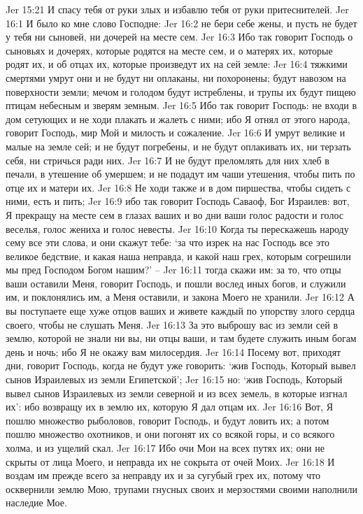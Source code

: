Jer 15:21  И спасу тебя от руки злых и избавлю тебя от руки притеснителей.
Jer 16:1  И было ко мне слово Господне:
Jer 16:2  не бери себе жены, и пусть не будет у тебя ни сыновей, ни дочерей на месте сем.
Jer 16:3  Ибо так говорит Господь о сыновьях и дочерях, которые родятся на месте сем, и о матерях их, которые родят их, и об отцах их, которые произведут их на сей земле:
Jer 16:4  тяжкими смертями умрут они и не будут ни оплаканы, ни похоронены; будут навозом на поверхности земли; мечом и голодом будут истреблены, и трупы их будут пищею птицам небесным и зверям земным.
Jer 16:5  Ибо так говорит Господь: не входи в дом сетующих и не ходи плакать и жалеть с ними; ибо Я отнял от этого народа, говорит Господь, мир Мой и милость и сожаление.
Jer 16:6  И умрут великие и малые на земле сей; и не будут погребены, и не будут оплакивать их, ни терзать себя, ни стричься ради них.
Jer 16:7  И не будут преломлять для них хлеб в печали, в утешение об умершем; и не подадут им чаши утешения, чтобы пить по отце их и матери их.
Jer 16:8  Не ходи также и в дом пиршества, чтобы сидеть с ними, есть и пить;
Jer 16:9  ибо так говорит Господь Саваоф, Бог Израилев: вот, Я прекращу на месте сем в глазах ваших и во дни ваши голос радости и голос веселья, голос жениха и голос невесты.
Jer 16:10  Когда ты перескажешь народу сему все эти слова, и они скажут тебе: `за что изрек на нас Господь все это великое бедствие, и какая наша неправда, и какой наш грех, которым согрешили мы пред Господом Богом нашим?' --
Jer 16:11  тогда скажи им: за то, что отцы ваши оставили Меня, говорит Господь, и пошли вослед иных богов, и служили им, и поклонялись им, а Меня оставили, и закона Моего не хранили.
Jer 16:12  А вы поступаете еще хуже отцов ваших и живете каждый по упорству злого сердца своего, чтобы не слушать Меня.
Jer 16:13  За это выброшу вас из земли сей в землю, которой не знали ни вы, ни отцы ваши, и там будете служить иным богам день и ночь; ибо Я не окажу вам милосердия.
Jer 16:14  Посему вот, приходят дни, говорит Господь, когда не будут уже говорить: `жив Господь, Который вывел сынов Израилевых из земли Египетской';
Jer 16:15  но: `жив Господь, Который вывел сынов Израилевых из земли северной и из всех земель, в которые изгнал их': ибо возвращу их в землю их, которую Я дал отцам их.
Jer 16:16  Вот, Я пошлю множество рыболовов, говорит Господь, и будут ловить их; а потом пошлю множество охотников, и они погонят их со всякой горы, и со всякого холма, и из ущелий скал.
Jer 16:17  Ибо очи Мои на всех путях их; они не скрыты от лица Моего, и неправда их не сокрыта от очей Моих.
Jer 16:18  И воздам им прежде всего за неправду их и за сугубый грех их, потому что осквернили землю Мою, трупами гнусных своих и мерзостями своими наполнили наследие Мое.
